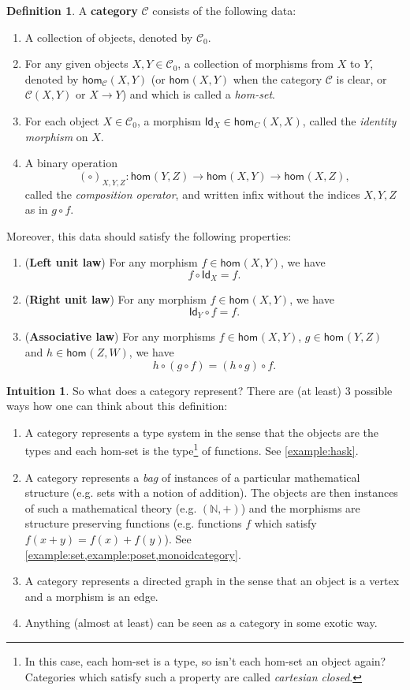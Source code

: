 \documentclass[a4paper,10pt]{scrartcl}
\theoremstyle{plain}
\theoremstyle{definition}
\newtheorem{dfn}[thm]{Definition}
\newtheorem{intu}[thm]{Intuition}
\newcommand{\cfont}[1]{\ensuremath{\mathsf{#1}}}
\newcommand{\Cat}[1]{\mathcal{#1}}
\newcommand{\CC}{\Cat{C}}
\newcommand{\Ob}[1]{{#1}_0}
\newcommand{\Hom}[3][]{\cfont{hom}_{#1}(#2,#3)}
\newcommand{\CHom}[3]{{#1}(#2,#3)}
\newcommand{\Id}[1][]{\cfont{Id}_{#1}}
\newcommand{\co}[2]{\ensuremath{#2 \circ #1}}
\begin{document}
\begin{dfn}\label{dfn:category}
  A \textbf{category} $\CC$ consists of the following data:
\begin{enumerate}
\item A collection of objects, denoted by $\Ob{\CC}$.
\item For any given objects $X,Y \in \Ob{\CC}$, a collection of morphisms from $X$ to $Y$, denoted by $\Hom[\CC]{X}{Y}$ (or $\Hom{X}{Y}$ when the category $\CC$ is clear, or $\CHom \CC X Y$ or $X \to Y$) and which is called a \textit{hom-set}.
\item For each object $X\in \Ob{\CC}$, a morphism $\Id[X] \in \Hom[C]{X}{X}$, called the \textit{identity morphism} on $X$.
\item A binary operation
\[
(\co{}{})_{X,Y,Z} : \Hom{Y}{Z} \to \Hom X Y \to \Hom X Z,
\]
called the \textit{composition operator}, and written infix without the indices $X,Y,Z$ as in $\co{f}{g}$.
\end{enumerate}
Moreover, this data should satisfy the following properties:
\begin{enumerate}
\item (\textbf{Left unit law}) For any morphism $f \in \Hom X Y$, we have 
\[
 \co{\Id[X]} {f} = f.
\]
\item (\textbf{Right unit law}) For any morphism $f \in \Hom X Y$, we have 
\[
  \co f {\Id[Y]} = f.
\]
\item (\textbf{Associative law}) For any morphisms $f\in \Hom X Y$, $g\in \Hom Y Z$ and $h\in \Hom Z W$, we have
\[
     \co {(\co f g)}{h} =  \co f {(\co g  h)}.
\]
\end{enumerate}
\end{dfn}

\begin{intu} So what does a category represent? There are (at least) $3$ possible ways how one can think about this definition:
\begin{enumerate}
\item A category represents a type system in the sense that the objects are the types and each hom-set is the type\footnote{In this case, each hom-set is a type, so isn't each hom-set an object again? Categories which satisfy such a property are called \textit{cartesian closed}.} of functions. See \cref{example:hask}.
\item A category represents a \textit{bag} of instances of a particular mathematical structure (e.g. sets with a notion of addition). The objects are then instances of such a mathematical theory (e.g. $(\mathbb{N},+)$) and the morphisms are structure preserving functions (e.g. functions $f$ which satisfy $f(x+y) = f(x) + f(y)$). See \cref{example:set,example:poset,monoidcategory}.
\item A category represents a directed graph in the sense that an object is a vertex and a morphism is an edge.
\item Anything (almost at least) can be seen as a category in some exotic way. 
\end{enumerate}
\end{intu}
\end{document}
